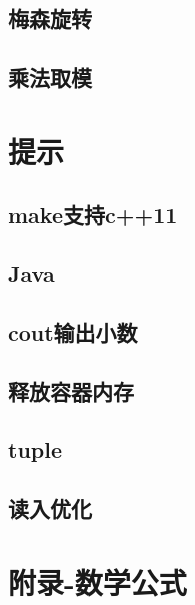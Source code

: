 \documentclass[titlepage,a4paper,10pt]{article}
\begin{document}
\begin{spacing}{0.8}
			\subsection{梅森旋转}
				
			\subsection{乘法取模}
				
			
		\section{提示}
			\subsection{make支持c++11}
				
			\subsection{Java}
				
			\subsection{cout输出小数}
				
			\subsection{释放容器内存}
				
			\subsection{tuple}
				
			\subsection{读入优化}
				
		\section{附录-数学公式}
		\end{spacing}
		\endgroup
\end{document}
